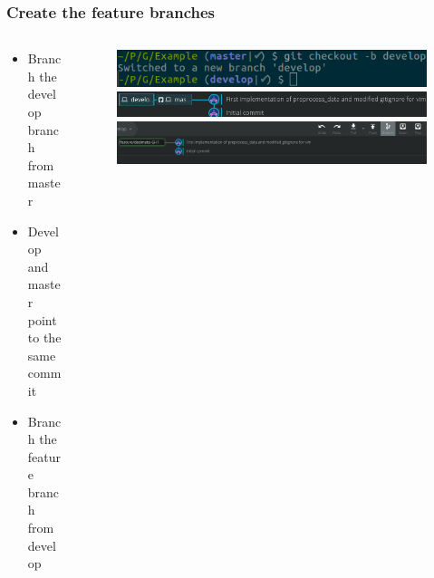 \begin{frame}
	\frametitle{Create the feature branches}
	\begin{columns}
		\begin{column}{0.4\textwidth}
			\begin{itemize}[<+->]
				\item Branch the develop branch from master
				\item Develop and master point to the same commit
				\item Branch the feature branch from develop
			\end{itemize}
		\end{column}
		\begin{column}{0.6\textwidth}
			\begin{figure}
				\centering
				\begin{overprint}
					\includegraphics[width=\textwidth]{./pictures/git_branch.png}
					\onslide<2>\includegraphics[width=\textwidth]{./pictures/develop_branch.png}
					\onslide<3>\includegraphics[width=\textwidth]{./pictures/feature_branch.png}
				\end{overprint}
			\end{figure}
		\end{column}
	\end{columns}
\end{frame}
